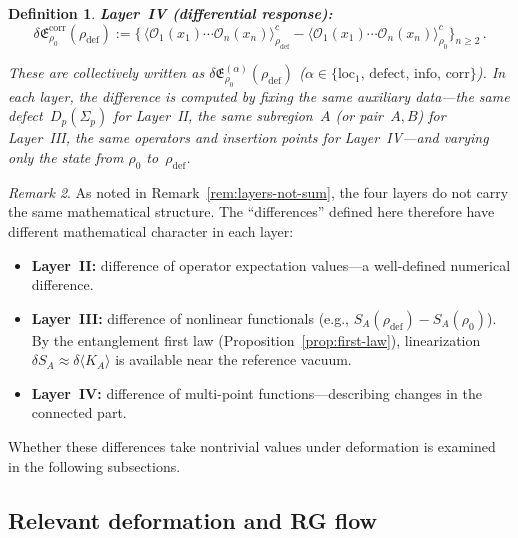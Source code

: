\documentclass[
  aps,
  prd,
  preprint,
  groupedaddress,
  nofootinbib,
  longbibliography
]{revtex4-2}
\newtheorem{definition}{Definition}[section]
\theoremstyle{remark}
\newtheorem{remark}[definition]{Remark}
\begin{document}
\begin{definition}
\textbf{Layer~IV (differential response):}
\begin{equation}\label{eq:delta-IV}
  \delta\mathfrak{E}_{\rho_0}^{\mathrm{corr}}%
    (\rho_{\mathrm{def}})
  := \bigl\{\,
    \langle\mathcal{O}_1(x_1)\cdots\mathcal{O}_n(x_n)
      \rangle_{\rho_{\mathrm{def}}}^c
    -\langle\mathcal{O}_1(x_1)\cdots\mathcal{O}_n(x_n)
      \rangle_{\rho_0}^c
  \bigr\}_{n\geq 2}\,.
\end{equation}

These are collectively written as
$\delta\mathfrak{E}_{\rho_0}^{(\alpha)}%
(\rho_{\mathrm{def}})$
($\alpha\in\{\mathrm{loc}_1,\,\mathrm{defect},\,
\mathrm{info},\,\mathrm{corr}\}$).
In each layer, the difference is computed by fixing the same
auxiliary data---the same defect~$D_p(\Sigma_p)$ for Layer~II,
the same subregion~$A$ (or pair~$A,B$) for Layer~III, the same
operators and insertion points for Layer~IV---and varying only
the state from $\rho_0$ to~$\rho_{\mathrm{def}}$.
\end{definition}

\begin{remark}\label{rem:diff-math}
As noted in Remark~\ref{rem:layers-not-sum}, the four layers do
not carry the same mathematical structure.
The ``differences'' defined here therefore have different
mathematical character in each layer:
\begin{itemize}
\item \textbf{Layer~II:} difference of operator expectation
  values---a well-defined numerical difference.
\item \textbf{Layer~III:} difference of nonlinear
  functionals (e.g.,
  $S_A(\rho_{\mathrm{def}})-S_A(\rho_0)$).
  By the entanglement first law
  (Proposition~\ref{prop:first-law}),
  linearization
  $\delta S_A\approx\delta\langle K_A\rangle$ is available
  near the reference vacuum.
\item \textbf{Layer~IV:} difference of multi-point
  functions---describing changes in the connected part.
\end{itemize}
Whether these differences take nontrivial values under
deformation is examined in the following subsections.
\end{remark}

\subsection{Relevant deformation and RG flow}\label{subsec:7-2}
\end{document}
